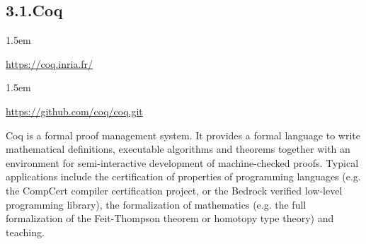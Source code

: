 \documentclass[12pt,twoside]{article}
\begin{document}
\subsection{3.1.\hspace*{0.5em}Coq}\label{sec-coq}%

\begin{mddefinitions}%


\begin{mdbmarginx}{}{}{}{1.5em}%
\begin{mddefdata}%
\href{https://coq.inria.fr/}{{\ttfamily https://\hspace{0pt}coq.\hspace{0pt}inria.\hspace{0pt}fr/\hspace{0pt}}}
\end{mddefdata}%
\end{mdbmarginx}%


\begin{mdbmarginx}{}{}{}{1.5em}%
\begin{mddefdata}%
\href{https://github.com/coq/coq.git}{{\ttfamily https://\hspace{0pt}github.\hspace{0pt}com/\hspace{0pt}coq/\hspace{0pt}coq.\hspace{0pt}git}}%
\end{mddefdata}%
\end{mdbmarginx}%
\end{mddefinitions}%

\noindent{}Coq is a formal proof management system. It provides a formal language
to write mathematical definitions, executable algorithms and theorems
together with an environment for semi-interactive development of
machine-checked proofs. Typical applications include the certification
of properties of programming languages (e.g. the CompCert compiler
certification project, or the Bedrock verified low-level programming
library), the formalization of mathematics (e.g. the full
formalization of the Feit-Thompson theorem or homotopy type theory)
and teaching.%
\end{document}
